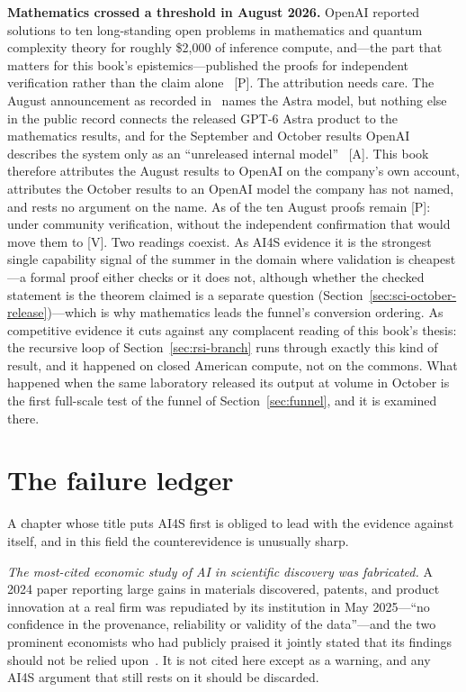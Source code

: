 \textbf{Mathematics crossed a threshold in August 2026.} OpenAI reported solutions to ten long-standing open problems in mathematics and quantum complexity theory for roughly \$2{,}000 of inference compute, and---the part that matters for this book's epistemics---published the proofs for independent verification rather than the claim alone~\cite{astra2026} [P]. The attribution needs care. The August announcement as recorded in~\cite{astra2026} names the Astra model, but nothing else in the public record connects the released GPT-6 Astra product to the mathematics results, and for the September and October results OpenAI describes the system only as an ``unreleased internal model''~\cite{sci-rw-openai} [A]. This book therefore attributes the August results to OpenAI on the company's own account, attributes the October results to an OpenAI model the company has not named, and rests no argument on the name. As of \datafreeze the ten August proofs remain [P]: under community verification, without the independent confirmation that would move them to [V]. Two readings coexist. As AI4S evidence it is the strongest single capability signal of the summer in the domain where validation is cheapest---a formal proof either checks or it does not, although whether the checked statement is the theorem claimed is a separate question (Section~\ref{sec:sci-october-release})---which is why mathematics leads the funnel's conversion ordering. As competitive evidence it cuts against any complacent reading of this book's thesis: the recursive loop of Section~\ref{sec:rsi-branch} runs through exactly this kind of result, and it happened on closed American compute, not on the commons. What happened when the same laboratory released its output at volume in October is the first full-scale test of the funnel of Section~\ref{sec:funnel}, and it is examined there.

\section{The failure ledger}

A chapter whose title puts AI4S first is obliged to lead with the evidence against itself, and in this field the counterevidence is unusually sharp.

\emph{The most-cited economic study of AI in scientific discovery was fabricated.} A 2024 paper reporting large gains in materials discovered, patents, and product innovation at a real firm was repudiated by its institution in May 2025---``no confidence in the provenance, reliability or validity of the data''---and the two prominent economists who had publicly praised it jointly stated that its findings should not be relied upon~\cite{mit-repudiation}. It is not cited here except as a warning, and any AI4S argument that still rests on it should be discarded.

